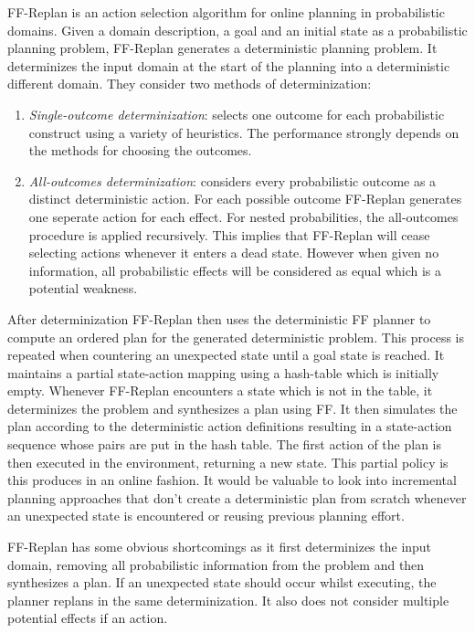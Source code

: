 \documentclass[runningheads,a4paper]{llncs}
\begin{document}
FF-Replan is an action selection algorithm for online planning in probabilistic domains. Given a domain description, a goal and an initial state as a probabilistic planning problem, FF-Replan generates a deterministic planning problem. It determinizes the input domain at the start of the planning into a deterministic different domain. They consider two methods of determinization:
\begin{enumerate}
\item \emph{Single-outcome determinization}: selects one outcome for each probabilistic construct using a variety of heuristics. The performance strongly depends on the methods for choosing the outcomes.
\item \emph{All-outcomes determinization}: considers every probabilistic outcome as a distinct deterministic action. For each possible outcome FF-Replan generates one seperate action for each effect. For nested probabilities, the all-outcomes procedure is applied recursively. This implies that FF-Replan will cease selecting actions whenever it enters a dead state. However when given no information, all probabilistic effects will be considered as equal which is a potential weakness.
\end{enumerate}

After determinization FF-Replan then uses the deterministic FF planner to compute an ordered plan for the generated deterministic problem. This process is repeated when countering an unexpected state until a goal state is reached. It maintains a partial state-action mapping using a hash-table which is initially empty. Whenever FF-Replan encounters a state which is not in the table, it determinizes the problem and synthesizes a plan using FF. It then simulates the plan according to the deterministic action definitions resulting in a state-action sequence whose pairs are put in the hash table. The first action of the plan is then executed in the environment, returning a new state. This partial policy is this produces in an online fashion. It would be valuable to look into incremental planning approaches that don't create a deterministic plan from scratch whenever an unexpected state is encountered or reusing previous planning effort.

FF-Replan has some obvious shortcomings as it first determinizes the input domain, removing all probabilistic information from the problem and then synthesizes a plan. If an unexpected state should occur whilst executing, the planner replans in the same determinization. It also does not consider multiple potential effects if an action.
\end{document}
